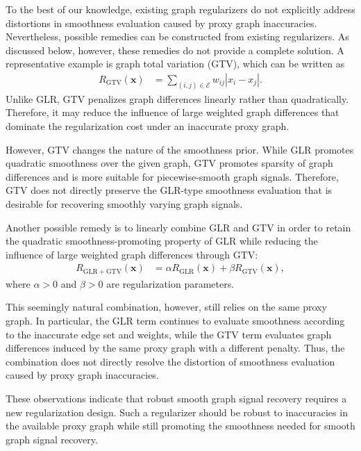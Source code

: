 To the best of our knowledge, existing graph regularizers do not explicitly address distortions in smoothness evaluation caused by proxy graph inaccuracies. Nevertheless, possible remedies can be constructed from existing regularizers. As discussed below, however, these remedies do not provide a complete solution. A representative example is graph total variation (GTV), which can be written as
\begin{equation}
\begin{aligned}
R_{\mathrm{GTV}}(\mathbf{x})
&= \sum_{(i,j)\in\mathcal{E}}
w_{ij}|x_i-x_j|.
\end{aligned}
\label{eq:gtv}
\end{equation}
Unlike GLR, GTV penalizes graph differences linearly rather than quadratically. Therefore, it may reduce the influence of large weighted graph differences that dominate the regularization cost under an inaccurate proxy graph.

However, GTV changes the nature of the smoothness prior. While GLR promotes quadratic smoothness over the given graph, GTV promotes sparsity of graph differences and is more suitable for piecewise-smooth graph signals. Therefore, GTV does not directly preserve the GLR-type smoothness evaluation that is desirable for recovering smoothly varying graph signals.

Another possible remedy is to linearly combine GLR and GTV in order to retain the quadratic smoothness-promoting property of GLR while reducing the influence of large weighted graph differences through GTV:
\begin{equation}
\begin{aligned}
R_{\mathrm{GLR+GTV}}(\mathbf{x})
&=
\alpha R_{\mathrm{GLR}}(\mathbf{x})
+
\beta R_{\mathrm{GTV}}(\mathbf{x}),
\end{aligned}
\label{eq:glr_gtv}
\end{equation}
where $\alpha>0$ and $\beta>0$ are regularization parameters.

This seemingly natural combination, however, still relies on the same proxy graph. In particular, the GLR term continues to evaluate smoothness according to the inaccurate edge set and weights, while the GTV term evaluates graph differences induced by the same proxy graph with a different penalty. Thus, the combination does not directly resolve the distortion of smoothness evaluation caused by proxy graph inaccuracies.

These observations indicate that robust smooth graph signal recovery requires a new regularization design. Such a regularizer should be robust to inaccuracies in the available proxy graph while still promoting the smoothness needed for smooth graph signal recovery.